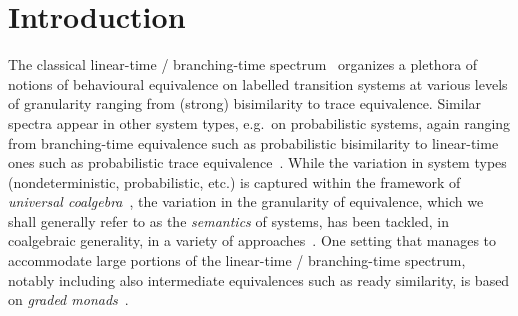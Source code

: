 \documentclass[sigconf,
			final%
			nonacm
                        ]{acmart}
\numberwithin{equation}{section}
\numberwithin{equation}{section}
\theoremstyle{plain}
\theoremstyle{definition}
\begin{document}




\maketitle

\section{Introduction}

\noindent The classical linear-time / branching-time
spectrum~\cite{Glabbeek90} organizes a plethora of notions of
behavioural equivalence on labelled transition systems at various
levels of granularity ranging from (strong) bisimilarity to trace
equivalence. Similar spectra appear in other system types, e.g.~on
probabilistic systems, again ranging from branching-time equivalence
such as probabilistic bisimilarity to linear-time ones such as
probabilistic trace equivalence~\cite{JouSmolka90}. While the
variation in system types (nondeterministic, probabilistic, etc.) is
captured within the framework of \emph{universal
  coalgebra}~\cite{Rutten00}, the variation in the granularity of
equivalence, which we shall generally refer to as the \emph{semantics}
of systems, has been tackled, in coalgebraic generality, in a variety
of approaches~\cite{HJS07,KR15,JSS15,JLR18}. One setting that
manages to accommodate large portions of the
linear-time / branching-time spectrum, notably including also
intermediate equivalences such as ready similarity, is based on
\emph{graded monads}~\cite{MPS15,DMS19,FMS21a}.
\end{document}
